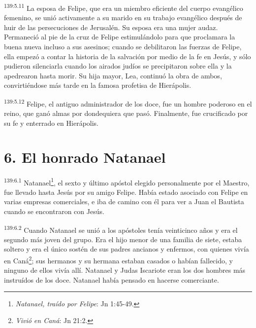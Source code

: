 \par
\textsuperscript{139:5.11} La esposa de Felipe, que era un miembro eficiente del cuerpo evangélico femenino, se unió activamente a su marido en su trabajo evangélico después de huir de las persecuciones de Jerusalén. Su esposa era una mujer audaz. Permaneció al pie de la cruz de Felipe estimulándolo para que proclamara la buena nueva incluso a sus asesinos; cuando se debilitaron las fuerzas de Felipe, ella empezó a contar la historia de la salvación por medio de la fe en Jesús, y sólo pudieron silenciarla cuando los airados judíos se precipitaron sobre ella y la apedrearon hasta morir. Su hija mayor, Lea, continuó la obra de ambos, convirtiéndose más tarde en la famosa profetisa de Hierápolis.

\par
\textsuperscript{139:5.12} Felipe, el antiguo administrador de los doce, fue un hombre poderoso en el reino, que ganó almas por dondequiera que pasó. Finalmente, fue crucificado por su fe y enterrado en Hierápolis.

\section*{6. El honrado Natanael}
\par
\textsuperscript{139:6.1} Natanael\footnote{\textit{Natanael, traído por Felipe}: Jn 1:45-49.}, el sexto y último apóstol elegido personalmente por el Maestro, fue llevado hasta Jesús por su amigo Felipe. Había estado asociado con Felipe en varias empresas comerciales, e iba de camino con él para ver a Juan el Bautista cuando se encontraron con Jesús.

\par
\textsuperscript{139:6.2} Cuando Natanael se unió a los apóstoles tenía veinticinco años y era el segundo más joven del grupo. Era el hijo menor de una familia de siete, estaba soltero y era el único sostén de sus padres ancianos y enfermos, con quienes vivía en Caná\footnote{\textit{Vivió en Caná}: Jn 21:2.}; sus hermanos y su hermana estaban casados o habían fallecido, y ninguno de ellos vivía allí. Natanael y Judas Iscariote eran los dos hombres más instruídos de los doce. Natanael había pensado en hacerse comerciante.

